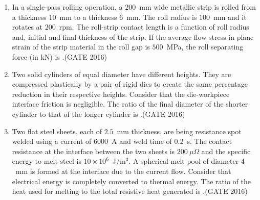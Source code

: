 \documentclass[journal,12pt,onecolumn]{IEEEtran}
\theoremstyle{remark}
\begin{document}
\begin{enumerate}
\item In a single-pass rolling operation, a $200$~mm wide metallic strip is rolled from a thickness $10$~mm to a thickness $6$~mm. The roll radius is $100$~mm and it rotates at $200$~rpm. The roll-strip contact length is a function of roll radius and, initial and final thickness of the strip. If the average flow stress in plane strain of the strip material in the roll gap is $500$~MPa, the roll separating force (in kN) is \underline{\hspace{2cm}}.\hfill{(GATE 2016)}
\vspace{0.5cm}

\item Two solid cylinders of equal diameter have different heights. They are compressed plastically by a pair of rigid dies to create the same percentage reduction in their respective heights. Consider that the die-workpiece interface friction is negligible. The ratio of the final diameter of the shorter cylinder to that of the longer cylinder is \underline{\hspace{2cm}}.\hfill{(GATE 2016)}
\vspace{0.5cm}

\item Two flat steel sheets, each of $2.5$~mm thickness, are being resistance spot welded using a current of $6000$~A and weld time of $0.2$~s. The contact resistance at the interface between the two sheets is $200~\mu\Omega$ and the specific energy to melt steel is $10 \times 10^6$~J/m$^3$. A spherical melt pool of diameter $4$~mm is formed at the interface due to the current flow. Consider that electrical energy is completely converted to thermal energy. The ratio of the heat used for melting to the total resistive heat generated is \underline{\hspace{2cm}}.\hfill{(GATE 2016)}
\vspace{0.5cm}


\end{enumerate}
\end{document}
